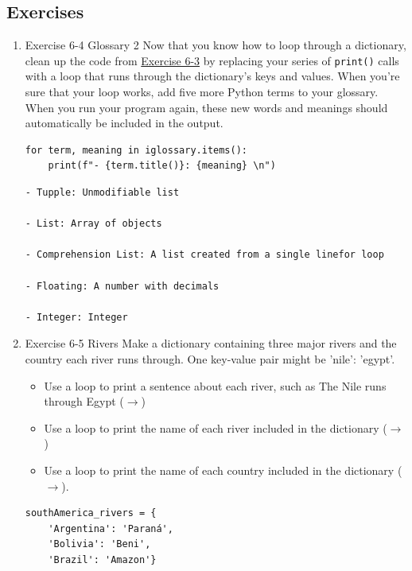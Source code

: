 \documentclass[10pt]{book}
\begin{document}
\subsection{Exercises}
\label{sec:orgacb4dbc}
\begin{enumerate}
\item Exercise 6-4 Glossary 2
\label{sec:org6007a84}
Now that you know how to loop through a dictionary, clean up the code from \hyperref[sec:org32dd5d6]{Exercise 6-3} by replacing your series of \texttt{print()} calls with a loop that runs through the dictionary’s keys and values. When you’re sure that your loop works, add five more Python terms to your glossary. When you run your program again, these new words and meanings should automatically be included in the output.

\begin{verbatim}
for term, meaning in iglossary.items():
    print(f"- {term.title()}: {meaning} \n")
\end{verbatim}

\label{org6926e19}
\begin{verbatim}
- Tupple: Unmodifiable list 

- List: Array of objects 

- Comprehension List: A list created from a single linefor loop 

- Floating: A number with decimals 

- Integer: Integer
\end{verbatim}
\item Exercise 6-5 Rivers
\label{sec:org1c8b3ce}
Make a dictionary containing three major rivers and the country each river runs through. One key-value pair might be 'nile': 'egypt'.
\begin{itemize}
\item Use a loop to print a sentence about each river, such as The Nile runs through Egypt  (\hyperref[org7baf589]{\(\rightarrow\)})
\item Use a loop to print the name of each river included in the dictionary (\hyperref[org1db64b8]{\(\rightarrow\)})
\item Use a loop to print the name of each country included in the dictionary (\hyperref[orgb47f3c9]{\(\rightarrow\)}).
\end{itemize}

\label{org8129544}
\begin{verbatim}
southAmerica_rivers = {
    'Argentina': 'Paraná',
    'Bolivia': 'Beni',
    'Brazil': 'Amazon'}
\end{verbatim}


\end{enumerate}
\end{document}

